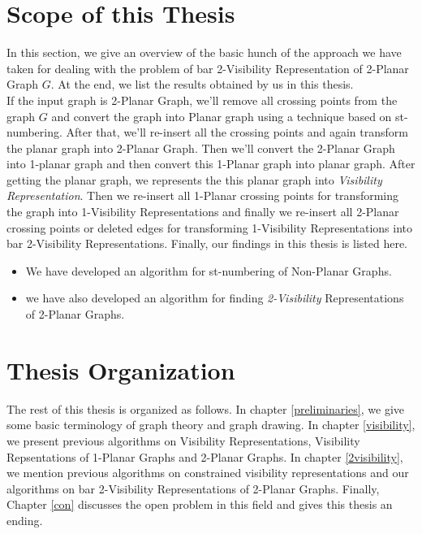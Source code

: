 \section{Scope of this Thesis}
\label{sec:scope}

In this section, we give an overview of the basic hunch of the approach we have taken for dealing with the problem of bar 2-Visibility Representation of 2-Planar Graph $G$. At the end, we list the results obtained by us in this thesis.\\
If the input graph is 2-Planar Graph, we'll remove all crossing points from the graph $G$ and convert the graph into Planar graph using a technique based on st-numbering. After that, we'll re-insert all the crossing points and again transform the planar graph into 2-Planar Graph. Then we'll convert the 2-Planar Graph into 1-planar graph and then convert this 1-Planar graph into planar graph. After getting the planar graph, we represents the this planar graph into \emph{Visibility Representation}\cite{R}. Then we re-insert all 1-Planar crossing points for transforming the graph into 1-Visibility Representations and finally we re-insert all 2-Planar crossing points or deleted edges for transforming 1-Visibility Representations into bar 2-Visibility Representations. Finally, our findings in this thesis is listed here.


\begin{itemize}
\item We have developed an algorithm for st-numbering of Non-Planar Graphs.
\item we have also developed an algorithm for finding \emph{2-Visibility} Representations of 2-Planar Graphs.

\end{itemize}



\section{Thesis Organization}
\label{sec:thesis}
The rest of this thesis is organized as follows. In chapter \ref{preliminaries}, we give some basic terminology of graph theory and graph drawing. In chapter \ref{visibility}, we present previous algorithms on Visibility Representations, Visibility Repsentations of 1-Planar Graphs and 2-Planar Graphs. In chapter  \ref{2visibility}, we mention previous algorithms on constrained visibility representations and our algorithms on bar 2-Visibility Representations of 2-Planar Graphs. Finally, Chapter  \ref{con} discusses the open problem in this field and gives this thesis an ending.




\endinput

